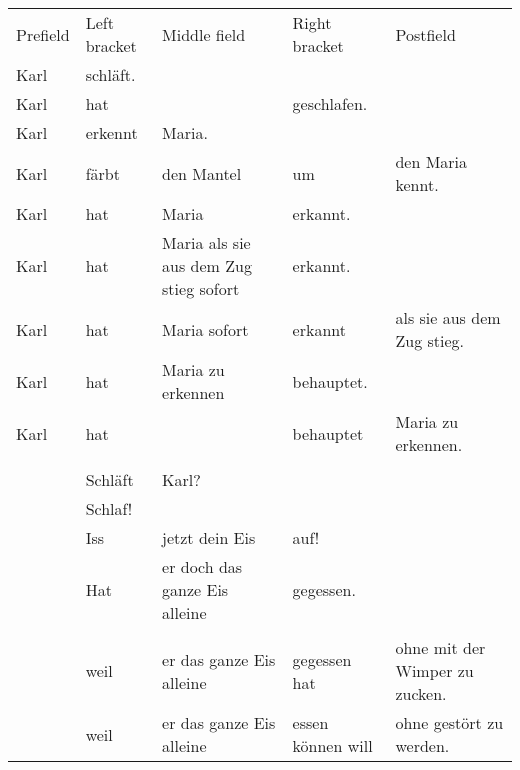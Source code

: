 \begin{table}
\begin{sideways}
\begin{tabular}{lllll}
Prefield & Left bracket & Middle field                           & Right bracket & Postfield                   \\\lsptoprule
Karl    & schläft.                                                                                            \\
Karl    & hat           &                                        & geschlafen.                                 \\
Karl    & erkennt       & Maria.                                                                               \\
Karl    & färbt         & den Mantel                             & um             & den Maria kennt.           \\
Karl    & hat           & Maria                                  & erkannt.                                    \\
Karl    & hat           & Maria als sie aus dem Zug stieg sofort & erkannt.                                    \\
Karl    & hat           & Maria sofort                           & erkannt        & als sie aus dem Zug stieg. \\
Karl    & hat           & Maria zu erkennen                      & behauptet.                                  \\
Karl    & hat           &                                        & behauptet      & Maria zu erkennen.         \\ \\
        & Schläft       & Karl?                                                                                \\
        & Schlaf!                                                                                              \\
        & Iss           & jetzt dein Eis                         & auf!                                        \\
        & Hat           & er doch das ganze Eis alleine          & gegessen.                                   \\  \\
        & weil          & er das ganze Eis alleine               & gegessen hat   & ohne mit der Wimper zu zucken.    \\
        & weil          & er das ganze Eis alleine               & essen können will   & ohne gestört zu werden.    \\

\end{tabular}
\end{sideways}
\end{table}
